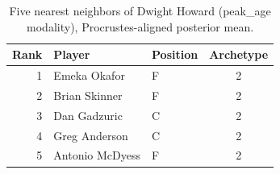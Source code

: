 \begin{table}[htbp]
  \centering\small
  \begin{tabular}{rllc}
    \toprule
    Rank & Player & Position & Archetype \\
    \midrule
    1 & Emeka Okafor & F & 2 \\
    2 & Brian Skinner & F & 2 \\
    3 & Dan Gadzuric & C & 2 \\
    4 & Greg Anderson & C & 2 \\
    5 & Antonio McDyess & F & 2 \\
    \bottomrule
  \end{tabular}
  \caption{Five nearest neighbors of Dwight Howard (peak_age modality), Procrustes-aligned posterior mean.}
  \label{tab:Dwight_Howard_neighbors_peak_age}
\end{table}

